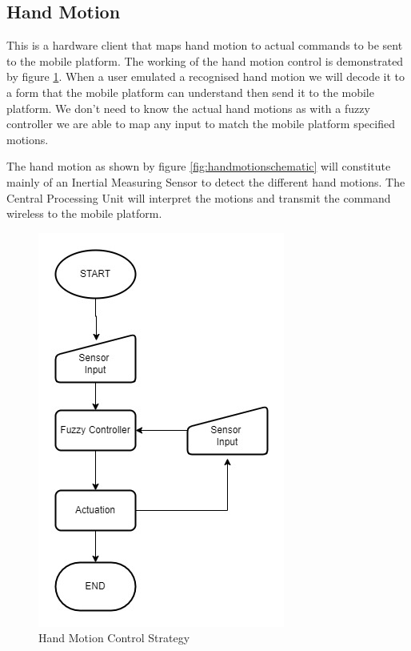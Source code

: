 \subsection{Hand Motion}

This is a hardware client that maps hand motion to actual commands to be sent to the mobile platform. The working of the hand motion control is demonstrated by figure \ref{fig:handmotioncontrol}. When a user emulated a recognised hand motion we will decode it to a form that the mobile platform can understand then send it to the mobile platform. We don't need to know the actual hand motions as with a fuzzy controller we are able to map any input to match the mobile platform specified motions.

The hand motion as shown by figure \ref{fig:handmotionschematic} will constitute mainly of an Inertial Measuring Sensor to detect the different hand motions. The Central Processing Unit will interpret the motions and transmit the command wireless to the mobile platform.

\begin{figure}[H]
    \centering
    \includegraphics[scale=0.5]{Figures/linefollowing-handmotion.jpg}
    \caption{Hand Motion Control Strategy}
    \label{fig:handmotioncontrol}
\end{figure}

